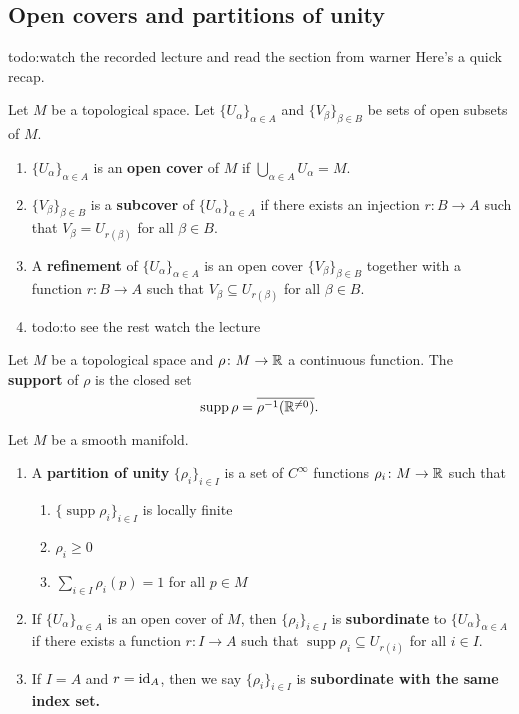 \subsection{Open covers and partitions of unity}
{\color{red}todo:watch the recorded lecture and read the section from warner} Here's a quick recap.
\begin{definition}[]
    Let $M$ be a topological space. Let $\{U_{\alpha }\} _{\alpha \in A}$ and $\{V_{\beta }\} _{\beta \in B}$ be sets of open subsets of $M$.
    \begin{enumerate}[label=(\roman*)]
        \item $\{U_{\alpha }\}_{\alpha \in A} $ is an \textbf{open cover} of $M$ if $\bigcup_{\alpha \in A} U_{\alpha }=M$.
        \item $\{V_{\beta }\} _{\beta \in B}$ is a \textbf{subcover} of $\{U_{\alpha }\} _{\alpha \in A}$ if there exists an injection $r \colon B \to A$ such that $V_{\beta }=U_{r(\beta )}$ for all $\beta \in B$.
        \item A \textbf{refinement} of $\{U_{\alpha }\} _{\alpha \in A}$ is an open cover $\{V_{\beta }\} _{\beta \in B}$ together with a function $r \colon B \to A$ such that $V_{\beta }\subseteq U_{r(\beta )}$ for all $\beta \in B$.
        \item {\color{red}todo:to see the rest watch the lecture} 
    \end{enumerate}
\end{definition}
\begin{definition}[]
    Let $M$ be a topological space and $\rho \colon M \to \mathbb{R}$ a continuous function. The \textbf{support} of $\rho$ is the closed set \[
        \operatorname{supp}\rho = \overline{\rho ^{-1}(\mathbb{R}^{\neq 0})}.
    \] 
\end{definition}
\begin{definition}[]
    Let $M$ be a smooth manifold. 
    \begin{enumerate}[label=(\roman*)]
        \item A \textbf{partition of unity} $\{\rho_i \} _{i\in I}$ is a set of $C^{\infty}$ functions $\rho _i \colon M \to \mathbb{R}$ such that 
            \begin{enumerate}[label=(\alph*)]
                \item $\{\operatorname{supp}\rho_i \} _{i \in I}$ is locally finite
                \item $\rho _i \geq 0$ 
                \item $\sum_{i\in I}^{} \rho _i (p)=1$ for all $p \in M$
            \end{enumerate}
        \item If $\{U_{\alpha }\} _{\alpha \in A}$ is an open cover of $M$, then $\{\rho _i \} _{i \in I}$ is \textbf{subordinate} to $\{U_{\alpha }\}_{\alpha \in A} $ if there exists a function $r \colon I \to A$ such that $\operatorname{supp}\rho _i \subseteq U_{r(i)}$ for all $i \in I$.
        \item If $I=A$ and $r=\operatorname{id}_A$, then we say $\{\rho _i \} _{i \in I}$ is \textbf{subordinate with the same index set.}
    \end{enumerate}
\end{definition}
